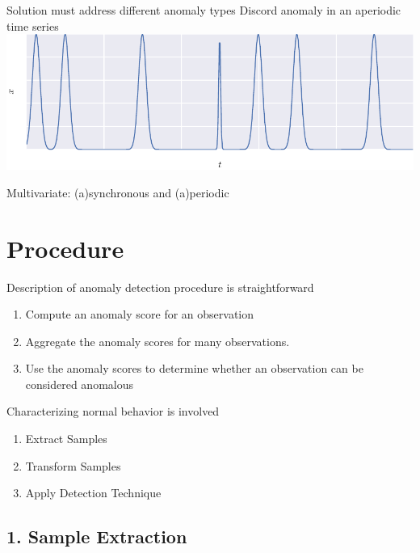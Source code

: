 \documentclass{beamer}
\begin{document}
\begin{frame}[allowframebreaks]{Solution must address different anomaly types}
    \framebreak
    Discord anomaly in an aperiodic time series
    \centering
    \includegraphics[width=\textwidth]{figs/discord_aper.pdf}

    \framebreak
    \centering
    Multivariate: (a)synchronous and (a)periodic

  \end{frame}


  \section{Procedure}

  \begin{frame}{Description of anomaly detection procedure is straightforward}

    \begin{enumerate}
    \item Compute an anomaly score for an observation
    \item Aggregate the anomaly scores for many observations.
    \item Use the anomaly scores to determine whether an observation can be considered anomalous
    \end{enumerate}

  \end{frame}

  \begin{frame}{Characterizing normal behavior is involved}

    \begin{enumerate}
    \item Extract Samples
    \item Transform Samples
    \item Apply Detection Technique
    \end{enumerate}

  \end{frame}


  \subsection{1. Sample Extraction}
  
\end{document}
